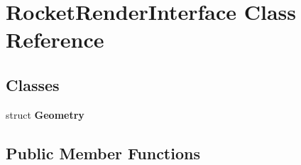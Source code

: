 \hypertarget{classRocketRenderInterface}{\section{\-Rocket\-Render\-Interface \-Class \-Reference}
\label{classRocketRenderInterface}
}
\subsection*{\-Classes}
\begin{DoxyCompactItemize}
\item 
struct {\bfseries \-Geometry}
\end{DoxyCompactItemize}
\subsection*{\-Public \-Member \-Functions}
